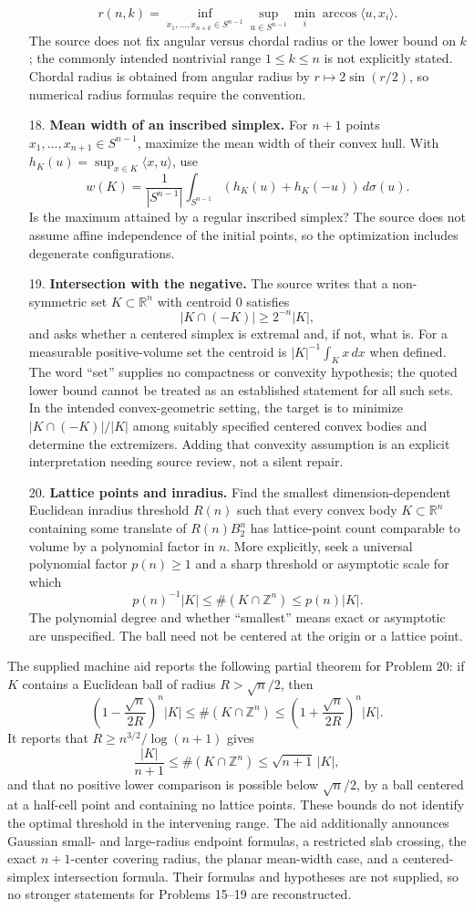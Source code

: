 \documentclass[11pt]{article}
\newcommand{\Z}{\mathbb{Z}}
\newcommand{\R}{\mathbb{R}}
\begin{document}
\begin{enumerate}
\[
 r(n,k)=\inf_{x_1,\ldots,x_{n+k}\in S^{n-1}}
 \sup_{u\in S^{n-1}}\min_i\arccos\langle u,x_i\rangle.
\]
The source does not fix angular versus chordal radius or the lower bound on $k$; the commonly intended nontrivial range $1\leq k\leq n$ is not explicitly stated. Chordal radius is obtained from angular radius by $r\mapsto2\sin(r/2)$, so numerical radius formulas require the convention.
\item[18.] \textbf{Mean width of an inscribed simplex.} For $n+1$ points $x_1,\ldots,x_{n+1}\in S^{n-1}$, maximize the mean width of their convex hull. With $h_K(u)=\sup_{x\in K}\langle x,u\rangle$, use
\[
 w(K)=\frac1{|S^{n-1}|}\int_{S^{n-1}}(h_K(u)+h_K(-u))\,d\sigma(u).
\]
Is the maximum attained by a regular inscribed simplex? The source does not assume affine independence of the initial points, so the optimization includes degenerate configurations.
\item[19.] \textbf{Intersection with the negative.} The source writes that a non-symmetric set $K\subset\R^n$ with centroid $0$ satisfies
\[
 |K\cap(-K)|\geq2^{-n}|K|,
\]
and asks whether a centered simplex is extremal and, if not, what is. For a measurable positive-volume set the centroid is $|K|^{-1}\int_Kx\,dx$ when defined. The word ``set'' supplies no compactness or convexity hypothesis; the quoted lower bound cannot be treated as an established statement for all such sets. In the intended convex-geometric setting, the target is to minimize $|K\cap(-K)|/|K|$ among suitably specified centered convex bodies and determine the extremizers. Adding that convexity assumption is an explicit interpretation needing source review, not a silent repair.
\item[20.] \textbf{Lattice points and inradius.} Find the smallest dimension-dependent Euclidean inradius threshold $R(n)$ such that every convex body $K\subset\R^n$ containing some translate of $R(n)B_2^n$ has lattice-point count comparable to volume by a polynomial factor in $n$. More explicitly, seek a universal polynomial factor $p(n)\geq1$ and a sharp threshold or asymptotic scale for which
\[
 p(n)^{-1}|K|\leq\#(K\cap\Z^n)\leq p(n)|K|.
\]
The polynomial degree and whether ``smallest'' means exact or asymptotic are unspecified. The ball need not be centered at the origin or a lattice point.
\end{enumerate}

The supplied machine aid reports the following partial theorem for Problem 20: if $K$ contains a Euclidean ball of radius $R>\sqrt n/2$, then
\[
 \left(1-\frac{\sqrt n}{2R}\right)^n|K|
 \leq\#(K\cap\Z^n)
 \leq\left(1+\frac{\sqrt n}{2R}\right)^n|K|.
\]
It reports that $R\geq n^{3/2}/\log(n+1)$ gives
\[
 \frac{|K|}{n+1}\leq\#(K\cap\Z^n)\leq\sqrt{n+1}\,|K|,
\]
and that no positive lower comparison is possible below $\sqrt n/2$, by a ball centered at a half-cell point and containing no lattice points. These bounds do not identify the optimal threshold in the intervening range. The aid additionally announces Gaussian small- and large-radius endpoint formulas, a restricted slab crossing, the exact $n+1$-center covering radius, the planar mean-width case, and a centered-simplex intersection formula. Their formulas and hypotheses are not supplied, so no stronger statements for Problems 15--19 are reconstructed.
\end{document}
